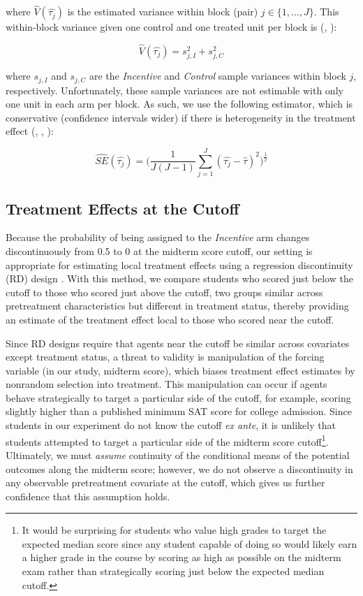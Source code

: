 \documentclass[12pt]{article}
\begin{document}
where $\hat{V}(\hat{\tau_j})$ is the estimated variance within block (pair) $j\in \{1,...,J\}$. This within-block variance given one control and one treated unit per block is (\cite{ir2015}, \cite{ai2017}):

\begin{equation} \label{v_block}
	\hat{V}(\hat{\tau_j}) = s_{j, I}^2 + s_{j, C}^2
\end{equation}

where $s_{j, I}$ and $s_{j, C}$ are the \textit{Incentive} and \textit{Control} sample variances within block $j$, respectively. Unfortunately, these sample variances are not estimable with only one unit in each arm per block. As such, we use the following estimator, which is conservative (confidence intervals wider) if there is heterogeneity in the treatment effect (\cite{imai2008}, \cite{ir2015}, \cite{ai2017}):

\begin{equation} \label{se_imai}
	\hat{SE}(\hat{\tau_j}) = \Big(\frac{1}{J(J-1)}\sum_{j=1}^{J} (\hat{\tau_j} - \hat{\tau})^2 \Big)^\frac{1}{2}
\end{equation}

\subsection{Treatment Effects at the Cutoff}

Because the probability of being assigned to the \textit{Incentive} arm changes discontinuously from 0.5 to 0 at the midterm score cutoff, our setting is appropriate for estimating local treatment effects using a regression discontinuity (RD) design \citep{tc1960, ap2008, il2008}. With this method, we compare students who scored just below the cutoff to those who scored just above the cutoff, two groups similar across pretreatment characteristics but different in treatment status, thereby providing an estimate of the treatment effect local to those who scored near the cutoff.

Since RD designs require that agents near the cutoff be similar across covariates except treatment status, a threat to validity is manipulation of the forcing variable (in our study, midterm score), which biases treatment effect estimates by nonrandom selection into treatment. This manipulation can occur if agents behave strategically to target a particular side of the cutoff, for example, scoring slightly higher than a published minimum SAT score for college admission. Since students in our experiment do not know the cutoff \textit{ex ante}, it is unlikely that students attempted to target a particular side of the midterm score cutoff\footnote{It would be surprising for students who value high grades to target the expected median score since any student capable of doing so would likely earn a higher grade in the course by scoring as high as possible on the midterm exam rather than strategically scoring just below the expected median cutoff.}. Ultimately, we must \textit{assume} continuity of the conditional means of the potential outcomes along the midterm score; however, we do not observe a discontinuity in any observable pretreatment covariate at the cutoff, which gives us further confidence that this assumption holds.
\end{document}
